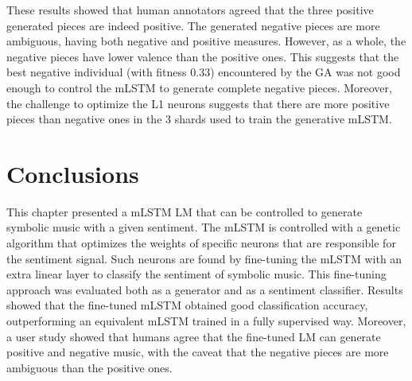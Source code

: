 These results showed that human annotators agreed that the three positive generated pieces are indeed positive. The generated negative pieces are more ambiguous, having both negative and positive measures. However, as a whole, the negative pieces have lower valence than the positive ones. This suggests that the best negative individual (with fitness $0.33$) encountered by the GA was not good enough to control the mLSTM to generate complete negative pieces. Moreover, the challenge to optimize the L1 neurons suggests that there are more positive pieces than negative ones in the 3 shards used to train the generative mLSTM.

\section{Conclusions}

This chapter presented a mLSTM LM that can be controlled to generate symbolic music with a given sentiment. The mLSTM is controlled with a genetic algorithm that optimizes the weights of specific neurons that are responsible for the sentiment signal. Such neurons are found by fine-tuning the mLSTM with an extra linear layer to classify the sentiment of symbolic music. This fine-tuning approach was evaluated both as a generator and as a sentiment classifier. Results showed that the fine-tuned mLSTM obtained good classification accuracy, outperforming an equivalent mLSTM trained in a fully supervised way. Moreover, a user study showed that humans agree that the fine-tuned LM can generate positive and negative music, with the caveat that the negative pieces are more ambiguous than the positive ones.

